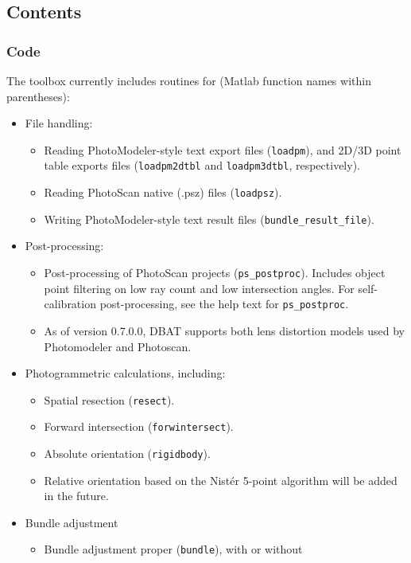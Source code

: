 \documentclass{article}
\begin{document}
\subsection{Contents}

\subsubsection{Code}
The toolbox currently includes routines for (Matlab function names within parentheses):
\begin{itemize}
\item File handling:
  \begin{itemize}
  \item Reading PhotoModeler-style text export files (\texttt{loadpm}), 
    and 2D/3D point table exports files (\texttt{loadpm2dtbl} and
    \texttt{loadpm3dtbl}, respectively).
  \item Reading PhotoScan native (.psz) files (\texttt{loadpsz}).
  \item Writing PhotoModeler-style text result files
    (\texttt{bundle\_result\_file}).
  \end{itemize}
\item Post-processing:
  \begin{itemize}
  \item Post-processing of PhotoScan projects (\texttt{ps\_postproc}).
    Includes object point filtering on low ray count and low
    intersection angles. For self-calibration post-processing,
    see the help text for \texttt{ps\_postproc}.
  \item As of version 0.7.0.0, DBAT supports both lens distortion
    models used by Photomodeler and Photoscan.
  \end{itemize}
\item Photogrammetric calculations, including:
  \begin{itemize}
  \item Spatial resection (\texttt{resect}).
  \item Forward intersection (\texttt{forwintersect}).
  \item Absolute orientation (\texttt{rigidbody}).
  \item Relative orientation based on the Nist{\'e}r 5-point algorithm
    \citep{Stewenius2006:Recent} will be added in the future.
  \end{itemize}
\item Bundle adjustment
  \begin{itemize}
  \item Bundle adjustment proper (\texttt{bundle}), with or without

\end{itemize}
\end{itemize}
\end{document}
